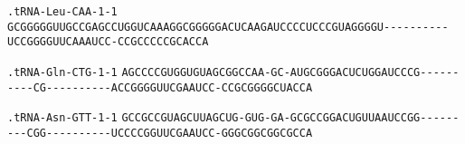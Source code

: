 \documentclass{article}
\newcommand{\rnabox}[1]{\colorbox{#1}{\texttt{#1}}}
\begin{document}
\texttt{.tRNA-Leu-CAA-1-1}
\rnabox{G}\rnabox{C}\rnabox{G}\rnabox{G}\rnabox{G}\rnabox{G}\rnabox{G}\rnabox{U}\rnabox{U}\rnabox{G}\rnabox{C}\rnabox{C}\rnabox{G}\rnabox{A}\rnabox{G}\rnabox{C}\rnabox{C}\rnabox{U}\rnabox{G}\rnabox{G}\rnabox{U}\rnabox{C}\rnabox{A}\rnabox{A}\rnabox{A}\rnabox{G}\rnabox{G}\rnabox{C}\rnabox{G}\rnabox{G}\rnabox{G}\rnabox{G}\rnabox{G}\rnabox{A}\rnabox{C}\rnabox{U}\rnabox{C}\rnabox{A}\rnabox{A}\rnabox{G}\rnabox{A}\rnabox{U}\rnabox{C}\rnabox{C}\rnabox{C}\rnabox{C}\rnabox{U}\rnabox{C}\rnabox{C}\rnabox{C}\rnabox{G}\rnabox{U}\rnabox{A}\rnabox{G}\rnabox{G}\rnabox{G}\rnabox{G}\rnabox{U}\rnabox{-}\rnabox{-}\rnabox{-}\rnabox{-}\rnabox{-}\rnabox{-}\rnabox{-}\rnabox{-}\rnabox{-}\rnabox{-}\rnabox{U}\rnabox{C}\rnabox{C}\rnabox{G}\rnabox{G}\rnabox{G}\rnabox{G}\rnabox{U}\rnabox{U}\rnabox{C}\rnabox{A}\rnabox{A}\rnabox{A}\rnabox{U}\rnabox{C}\rnabox{C}\rnabox{-}\rnabox{C}\rnabox{C}\rnabox{G}\rnabox{C}\rnabox{C}\rnabox{C}\rnabox{C}\rnabox{C}\rnabox{G}\rnabox{C}\rnabox{A}\rnabox{C}\rnabox{C}\rnabox{A}

\vspace{-0.5mm}

\texttt{.tRNA-Gln-CTG-1-1}
\rnabox{A}\rnabox{G}\rnabox{C}\rnabox{C}\rnabox{C}\rnabox{C}\rnabox{G}\rnabox{U}\rnabox{G}\rnabox{G}\rnabox{U}\rnabox{G}\rnabox{U}\rnabox{A}\rnabox{G}\rnabox{C}\rnabox{G}\rnabox{G}\rnabox{C}\rnabox{C}\rnabox{A}\rnabox{A}\rnabox{-}\rnabox{G}\rnabox{C}\rnabox{-}\rnabox{A}\rnabox{U}\rnabox{G}\rnabox{C}\rnabox{G}\rnabox{G}\rnabox{G}\rnabox{A}\rnabox{C}\rnabox{U}\rnabox{C}\rnabox{U}\rnabox{G}\rnabox{G}\rnabox{A}\rnabox{U}\rnabox{C}\rnabox{C}\rnabox{C}\rnabox{G}\rnabox{-}\rnabox{-}\rnabox{-}\rnabox{-}\rnabox{-}\rnabox{-}\rnabox{-}\rnabox{-}\rnabox{-}\rnabox{-}\rnabox{C}\rnabox{G}\rnabox{-}\rnabox{-}\rnabox{-}\rnabox{-}\rnabox{-}\rnabox{-}\rnabox{-}\rnabox{-}\rnabox{-}\rnabox{-}\rnabox{A}\rnabox{C}\rnabox{C}\rnabox{G}\rnabox{G}\rnabox{G}\rnabox{G}\rnabox{U}\rnabox{U}\rnabox{C}\rnabox{G}\rnabox{A}\rnabox{A}\rnabox{U}\rnabox{C}\rnabox{C}\rnabox{-}\rnabox{C}\rnabox{C}\rnabox{G}\rnabox{C}\rnabox{G}\rnabox{G}\rnabox{G}\rnabox{G}\rnabox{C}\rnabox{U}\rnabox{A}\rnabox{C}\rnabox{C}\rnabox{A}

\vspace{-0.5mm}

\texttt{.tRNA-Asn-GTT-1-1}
\rnabox{G}\rnabox{C}\rnabox{C}\rnabox{G}\rnabox{C}\rnabox{C}\rnabox{G}\rnabox{U}\rnabox{A}\rnabox{G}\rnabox{C}\rnabox{U}\rnabox{U}\rnabox{A}\rnabox{G}\rnabox{C}\rnabox{U}\rnabox{G}\rnabox{-}\rnabox{G}\rnabox{U}\rnabox{G}\rnabox{-}\rnabox{G}\rnabox{A}\rnabox{-}\rnabox{G}\rnabox{C}\rnabox{G}\rnabox{C}\rnabox{C}\rnabox{G}\rnabox{G}\rnabox{A}\rnabox{C}\rnabox{U}\rnabox{G}\rnabox{U}\rnabox{U}\rnabox{A}\rnabox{A}\rnabox{U}\rnabox{C}\rnabox{C}\rnabox{G}\rnabox{G}\rnabox{-}\rnabox{-}\rnabox{-}\rnabox{-}\rnabox{-}\rnabox{-}\rnabox{-}\rnabox{-}\rnabox{-}\rnabox{C}\rnabox{G}\rnabox{G}\rnabox{-}\rnabox{-}\rnabox{-}\rnabox{-}\rnabox{-}\rnabox{-}\rnabox{-}\rnabox{-}\rnabox{-}\rnabox{-}\rnabox{U}\rnabox{C}\rnabox{C}\rnabox{C}\rnabox{C}\rnabox{G}\rnabox{G}\rnabox{U}\rnabox{U}\rnabox{C}\rnabox{G}\rnabox{A}\rnabox{A}\rnabox{U}\rnabox{C}\rnabox{C}\rnabox{-}\rnabox{G}\rnabox{G}\rnabox{G}\rnabox{C}\rnabox{G}\rnabox{G}\rnabox{C}\rnabox{G}\rnabox{G}\rnabox{C}\rnabox{G}\rnabox{C}\rnabox{C}\rnabox{A}
\end{document}
